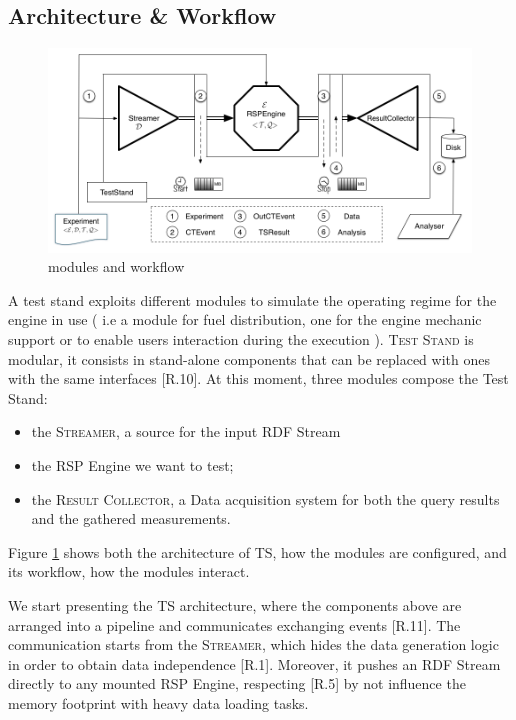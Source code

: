 \subsection{Architecture \& Workflow}

\begin{figure}[tbh]
\centering
\includegraphics[scale=0.37]{images/schema2}
\caption{\name modules and workflow} 
\label{fig:architecture}
\end{figure}

\noindent A test stand exploits different modules to simulate the operating regime for the engine in use ( i.e a module for fuel distribution, one for the engine mechanic support or to enable users interaction during the execution ). \name \textsc{Test Stand}  is modular, it consists in stand-alone components that can be replaced with ones with the same interfaces [R.10]. At this moment, three modules compose the Test Stand:
\begin{itemize}
\item the \textsc{Streamer}, a source for the input RDF Stream
\item the RSP Engine we want to test;
\item the \textsc{Result Collector}, a Data acquisition system for both the query results and the gathered measurements.
\end{itemize}
Figure \ref{fig:architecture} shows both the architecture of \name TS, how the modules are configured, and its workflow, how the modules interact.

We start presenting the TS architecture, where the components above are arranged into a pipeline and communicates exchanging events [R.11].  The communication starts from the \textsc{Streamer}, which hides the data generation logic in order to obtain data independence [R.1]. Moreover, it pushes an RDF Stream directly to any mounted RSP Engine, respecting [R.5] by not influence the memory footprint with heavy data loading tasks. 

